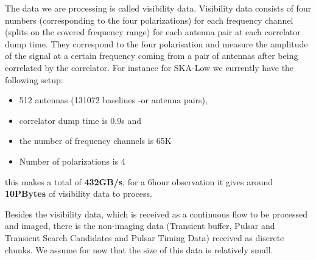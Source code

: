 The data we are processing is called visibility data. Visibility data consists of four numbers (corresponding to the four polarizations) 
 for each frequency channel (splits on the covered frequency range)
 for each antenna pair at each correlator dump time. 
They correspond to the four polarisation and measure the amplitude of the signal at a certain frequency coming from a pair of antennas after
being correlated by the correlator. For instance for SKA-Low we currently have the following setup:
\begin{itemize}
\item 512 antennas (131072 baselines -or antenna pairs), 
\item correlator dump time is 0.9s and 
\item the number of frequency channels is 65K
\item Number of polarizations is 4
\end{itemize}

this makes a total of \textbf{432GB/s}, for a 6hour observation it gives around \textbf{10PBytes} of visibility data to process.

Besides the visibility data, which is received as a continuous flow to be processed and imaged, there is the non-imaging
data (Transient buffer, Pulsar and Transient Search Candidates and Pulsar Timing Data) received as discrete chunks. 
We assume for now that the size of this data is relatively small.


